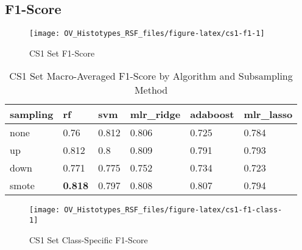 \documentclass[
]{report}
\begin{document}
\hypertarget{f1-score-2}{%
\subsection{F1-Score}\label{f1-score-2}}

\begin{figure}[H]

{\centering \texttt{[image: OV\_Histotypes\_RSF\_files/figure-latex/cs1-f1-1]} 

}

\caption{CS1 Set F1-Score}\label{fig:cs1-f1}
\end{figure}

\begin{table}

\caption{\label{tab:cs1-f1-table}CS1 Set Macro-Averaged F1-Score by Algorithm and Subsampling Method}
\centering
\begin{tabular}[t]{l|l|l|l|l|l}
\hline
sampling & rf & svm & mlr\_ridge & adaboost & mlr\_lasso\\
\hline
none & 0.76 & 0.812 & 0.806 & 0.725 & 0.784\\
\hline
up & 0.812 & 0.8 & 0.809 & 0.791 & 0.793\\
\hline
down & 0.771 & 0.775 & 0.752 & 0.734 & 0.723\\
\hline
smote & \textbf{0.818} & 0.797 & 0.808 & 0.807 & 0.794\\
\hline
\end{tabular}
\end{table}

\begin{figure}[H]

{\centering \texttt{[image: OV\_Histotypes\_RSF\_files/figure-latex/cs1-f1-class-1]} 

}

\caption{CS1 Set Class-Specific F1-Score}\label{fig:cs1-f1-class}
\end{figure}
\end{document}
